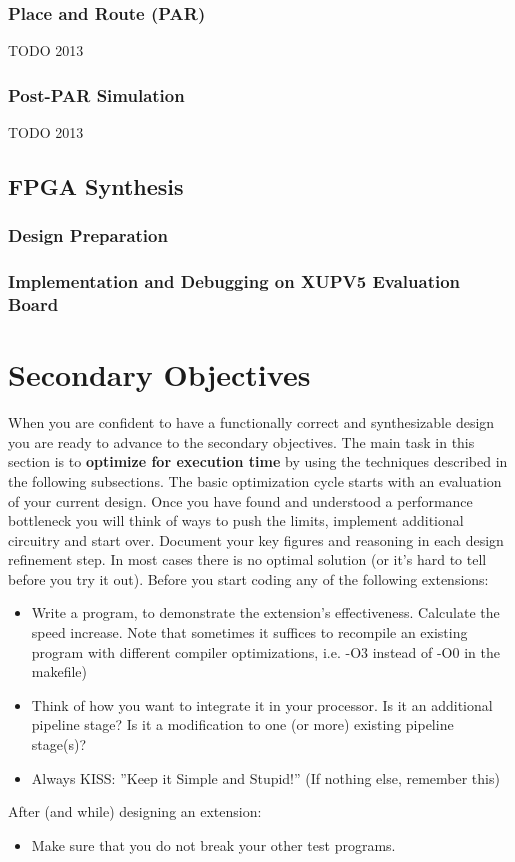 \subsubsection{Place and Route (PAR)}
TODO 2013
\subsubsection{Post-PAR Simulation}
TODO 2013

\subsection{FPGA Synthesis}
\subsubsection{Design Preparation}

\subsubsection{Implementation and Debugging on XUPV5 Evaluation Board}



\newpage
\section{Secondary Objectives}
When you are confident to have a functionally correct and synthesizable design you are ready to advance to the secondary objectives. The main task in this section is to 
\textbf{optimize for execution time} by using the techniques described in the following subsections. The basic optimization cycle starts with an evaluation of your current design. Once you have found and understood a performance bottleneck you will think of ways to push the limits, implement additional circuitry and start over.  Document your key figures and reasoning in each design refinement step. In most cases there is no optimal solution (or it's hard to tell before you try it out).
Before you start coding any of the following extensions:
\begin{itemize}
\item Write a program, to demonstrate the extension's effectiveness. Calculate the speed increase. Note that sometimes it suffices to recompile an existing program with different compiler optimizations, i.e. -O3 instead of -O0 in the makefile)
\item Think of how you want to integrate it in your processor. Is it an additional pipeline stage? Is it a modification to one (or more) existing pipeline stage(s)?
\item Always KISS: ''Keep it Simple and Stupid!'' (If nothing else, remember this)
\end{itemize}
After (and while) designing an extension:
\begin{itemize}
\item Make sure that you do not break your other test programs.
\end{itemize}

